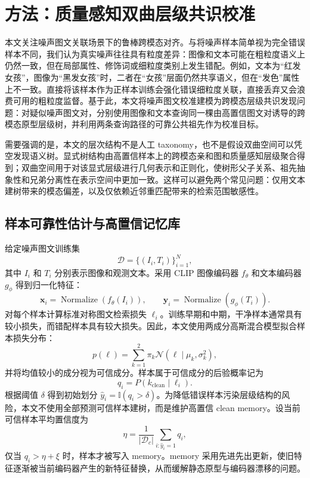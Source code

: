 \section{方法：质量感知双曲层级共识校准}
\label{sec:method_final_hhnc}

本文关注噪声图文关联场景下的鲁棒跨模态对齐。与将噪声样本简单视为完全错误样本不同，我们认为真实噪声往往具有粒度差异：图像和文本可能在粗粒度语义上仍然一致，但在局部属性、修饰词或细粒度类别上发生错配。例如，文本为“红发女孩”，图像为“黑发女孩”时，二者在“女孩”层面仍然共享语义，但在“发色”属性上不一致。直接将该样本作为正样本训练会强化错误细粒度关联，直接丢弃又会浪费可用的粗粒度监督。基于此，本文将噪声图文校准建模为跨模态层级共识发现问题：对疑似噪声图文对，分别使用图像和文本查询同一棵由高置信图文对诱导的跨模态原型层级树，并利用两条查询路径的可靠公共祖先作为校准目标。

需要强调的是，本文的层次结构不是人工 taxonomy，也不是假设双曲空间可以凭空发现语义树。显式树结构由高置信样本上的跨模态亲和图和质量感知层级聚合得到；双曲空间用于对该显式层级进行几何表示和正则化，使树形父子关系、祖先抽象性和兄弟分离性在表示空间中更加一致。这样可以避免两个常见问题：仅用文本建树带来的模态偏差，以及仅依赖近邻重匹配带来的检索范围敏感性。

\subsection{样本可靠性估计与高置信记忆库}

给定噪声图文训练集
\begin{equation}
    \mathcal{D}=\{(I_i,T_i)\}_{i=1}^{N},
\end{equation}
其中 $I_i$ 和 $T_i$ 分别表示图像和观测文本。采用 CLIP 图像编码器 $f_{\theta}$ 和文本编码器 $g_{\phi}$ 得到归一化特征：
\begin{equation}
    \boldsymbol{x}_i=\operatorname{Normalize}(f_{\theta}(I_i)),\qquad
    \boldsymbol{y}_i=\operatorname{Normalize}(g_{\phi}(T_i)).
\end{equation}
对每个样本计算标准对称图文检索损失 $\ell_i$。训练早期和中期，干净样本通常具有较小损失，而错配样本具有较大损失。因此，本文使用两成分高斯混合模型拟合样本损失分布：
\begin{equation}
    p(\ell)=\sum_{k=1}^{2}\pi_k\mathcal{N}(\ell\mid\mu_k,\sigma_k^2),
\end{equation}
并将均值较小的成分视为可信成分。样本属于可信成分的后验概率记为
\begin{equation}
    q_i=P(k_{\mathrm{clean}}\mid \ell_i).
\end{equation}
根据阈值 $\delta$ 得到初始划分 $\hat{y}_i=\mathbb{I}(q_i>\delta)$。为降低错误样本污染层级结构的风险，本文不使用全部预测可信样本建树，而是维护高置信 clean memory。设当前可信样本平均置信度为
\begin{equation}
    \eta=\frac{1}{|\mathcal{D}_c|}\sum_{i:\hat{y}_i=1}q_i,
\end{equation}
仅当 $q_i>\eta+\xi$ 时，样本才被写入 memory。memory 采用先进先出更新，使旧特征逐渐被当前编码器产生的新特征替换，从而缓解静态原型与编码器漂移的问题。

